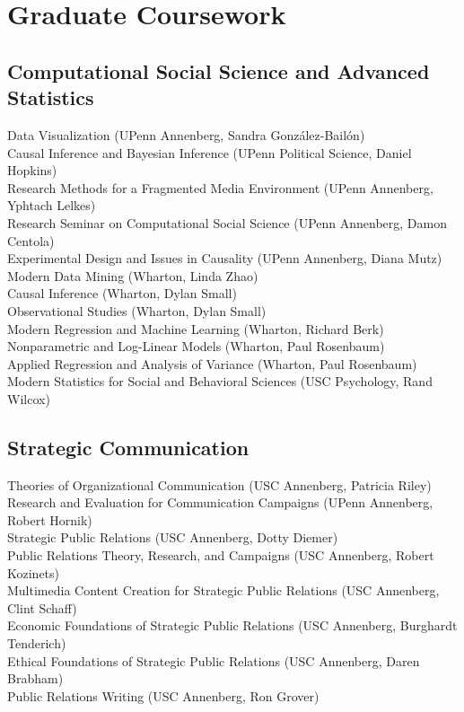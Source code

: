 \documentclass[12pt, letterpaper]{article}
\newcommand{\years}[1]{\marginnote{\normalsize #1}}
\begin{document}
{%

\section*{Graduate Coursework}

\subsection*{Computational Social Science and Advanced Statistics}

  \years{} Data Visualization (UPenn Annenberg, Sandra González-Bailón)\\
  \years{} Causal Inference and Bayesian Inference (UPenn Political Science, Daniel Hopkins)\\
  \years{} Research Methods for a Fragmented Media Environment (UPenn Annenberg, Yphtach Lelkes)\\
  \years{} Research Seminar on Computational Social Science (UPenn Annenberg, Damon Centola)\\
  \years{} Experimental Design and Issues in Causality (UPenn Annenberg, Diana Mutz)\\
  \years{} Modern Data Mining (Wharton, Linda Zhao)\\
  \years{} Causal Inference (Wharton, Dylan Small)\\
  \years{} Observational Studies (Wharton, Dylan Small)\\
  \years{} Modern Regression and Machine Learning (Wharton, Richard Berk)\\
  \years{} Nonparametric and Log-Linear Models (Wharton, Paul Rosenbaum)\\
  \years{} Applied Regression and Analysis of Variance (Wharton, Paul Rosenbaum)\\
  \years{} Modern Statistics for Social and Behavioral Sciences (USC Psychology, Rand Wilcox)

\subsection*{Strategic Communication}

  \years{} Theories of Organizational Communication (USC Annenberg, Patricia Riley)\\
  \years{} Research and Evaluation for Communication Campaigns (UPenn Annenberg, Robert Hornik)\\
  \years{} Strategic Public Relations (USC Annenberg, Dotty Diemer)\\
  \years{} Public Relations Theory, Research, and Campaigns (USC Annenberg, Robert Kozinets)\\
  \years{} Multimedia Content Creation for Strategic Public Relations (USC Annenberg, Clint Schaff)\\
  \years{} Economic Foundations of Strategic Public Relations (USC Annenberg, Burghardt Tenderich)\\
  \years{} Ethical Foundations of Strategic Public Relations (USC Annenberg, Daren Brabham)\\
  \years{} Public Relations Writing (USC Annenberg, Ron Grover)

}
\end{document}
